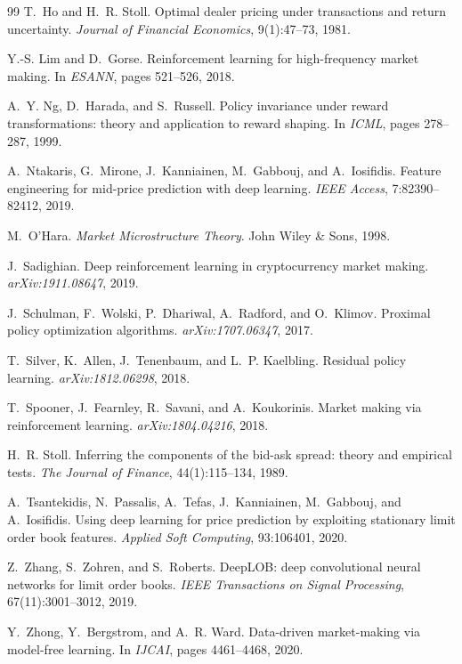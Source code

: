 \documentclass{article}
\begin{document}
\begin{thebibliography}{99}
T.~Ho and H.~R. Stoll.
\newblock Optimal dealer pricing under transactions and return uncertainty.
\newblock \emph{Journal of Financial Economics}, 9(1):47--73, 1981.

Y.-S. Lim and D.~Gorse.
\newblock Reinforcement learning for high-frequency market making.
\newblock In \emph{ESANN}, pages 521--526, 2018.

A.~Y. Ng, D.~Harada, and S.~Russell.
\newblock Policy invariance under reward transformations: theory and application to reward shaping.
\newblock In \emph{ICML}, pages 278--287, 1999.

A.~Ntakaris, G.~Mirone, J.~Kanniainen, M.~Gabbouj, and A.~Iosifidis.
\newblock Feature engineering for mid-price prediction with deep learning.
\newblock \emph{IEEE Access}, 7:82390--82412, 2019.

M.~O'Hara.
\newblock \emph{Market Microstructure Theory}.
\newblock John Wiley \& Sons, 1998.

J.~Sadighian.
\newblock Deep reinforcement learning in cryptocurrency market making.
\newblock \emph{arXiv:1911.08647}, 2019.

J.~Schulman, F.~Wolski, P.~Dhariwal, A.~Radford, and O.~Klimov.
\newblock Proximal policy optimization algorithms.
\newblock \emph{arXiv:1707.06347}, 2017.

T.~Silver, K.~Allen, J.~Tenenbaum, and L.~P. Kaelbling.
\newblock Residual policy learning.
\newblock \emph{arXiv:1812.06298}, 2018.

T.~Spooner, J.~Fearnley, R.~Savani, and A.~Koukorinis.
\newblock Market making via reinforcement learning.
\newblock \emph{arXiv:1804.04216}, 2018.

H.~R. Stoll.
\newblock Inferring the components of the bid-ask spread: theory and empirical tests.
\newblock \emph{The Journal of Finance}, 44(1):115--134, 1989.

A.~Tsantekidis, N.~Passalis, A.~Tefas, J.~Kanniainen, M.~Gabbouj, and A.~Iosifidis.
\newblock Using deep learning for price prediction by exploiting stationary limit order book features.
\newblock \emph{Applied Soft Computing}, 93:106401, 2020.

Z.~Zhang, S.~Zohren, and S.~Roberts.
\newblock DeepLOB: deep convolutional neural networks for limit order books.
\newblock \emph{IEEE Transactions on Signal Processing}, 67(11):3001--3012, 2019.

Y.~Zhong, Y.~Bergstrom, and A.~R. Ward.
\newblock Data-driven market-making via model-free learning.
\newblock In \emph{IJCAI}, pages 4461--4468, 2020.

\end{thebibliography}
\newpage
\appendix
\end{document}
